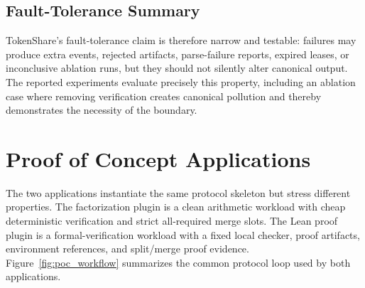 \documentclass{article}
\theoremstyle{plain}
\begin{document}
\subsection{Fault-Tolerance Summary}

{\color{blue}
TokenShare's fault-tolerance claim is therefore narrow and testable: failures may produce extra events, rejected artifacts, parse-failure reports, expired leases, or inconclusive ablation runs, but they should not silently alter canonical output. The reported experiments evaluate precisely this property, including an ablation case where removing verification creates canonical pollution and thereby demonstrates the necessity of the boundary.
}
\section{Proof of Concept Applications}



{\color{blue}
The two applications instantiate the same protocol skeleton but stress different properties. The factorization plugin is a clean arithmetic workload with cheap deterministic verification and strict all-required merge slots. The Lean proof plugin is a formal-verification workload with a fixed local checker, proof artifacts, environment references, and split/merge proof evidence. Figure~\ref{fig:poc_workflow} summarizes the common protocol loop used by both applications.
}
\end{document}
